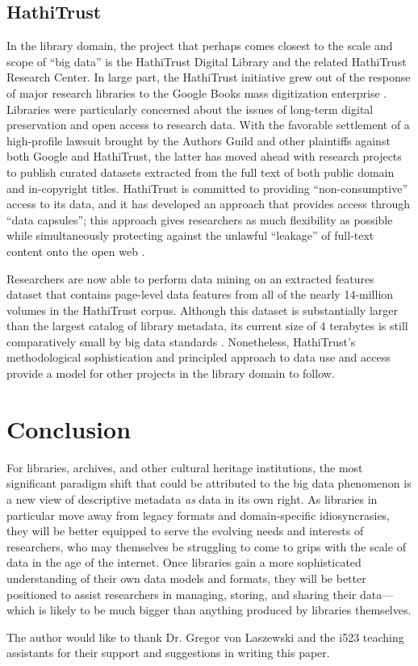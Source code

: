 \documentclass[sigconf]{acmart}
\begin{document}
\subsection{HathiTrust}
In the library domain, the project that perhaps comes closest to the scale and scope of ``big data'' is the HathiTrust Digital Library and the related HathiTrust Research Center. In large part, the HathiTrust initiative grew out of the response of major research libraries to the Google Books mass digitization enterprise \cite{hC10, bP13, jZ14}. Libraries were particularly concerned about the issues of long-term digital preservation and open access to research data. With the favorable settlement of a high-profile lawsuit brought by the Authors Guild and other plaintiffs against both Google and HathiTrust, the latter has moved ahead with research projects to publish curated datasets extracted from the full text of both public domain and in-copyright titles. HathiTrust is committed to providing ``non-consumptive'' access to its data, and it has developed an approach that provides access through ``data capsules''; this approach gives researchers as much flexibility as possible while simultaneously protecting against the unlawful ``leakage'' of full-text content onto the open web \cite{jZ14}.

Researchers are now able to perform data mining on an extracted features dataset that contains page-level data features from all of the nearly 14-million volumes in the HathiTrust corpus. Although this dataset is substantially larger than the largest catalog of library metadata, its current size of 4 terabytes is still comparatively small by big data standards \cite{hT17}. Nonetheless, HathiTrust's methodological sophistication and principled approach to data use and access provide a model for other projects in the library domain to follow.

\section{Conclusion}
For libraries, archives, and other cultural heritage institutions, the most significant paradigm shift that could be attributed to the big data phenomenon is a new view of descriptive metadata \textit{as} data in its own right. As libraries in particular move away from legacy formats and domain-specific idiosyncrasies, they will be better equipped to serve the evolving needs and interests of researchers, who may themselves be struggling to come to grips with the scale of data in the age of the internet. Once libraries gain a more sophisticated understanding of their own data models and formats, they will be better positioned to assist researchers in managing, storing, and sharing their data---which is likely to be much bigger than anything produced by libraries themselves.

\begin{acks}
The author would like to thank Dr. Gregor von Laszewski and the i523 teaching assistants for their support and suggestions in writing this paper.
\end{acks}


 


\end{document}

